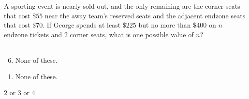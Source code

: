  
A sporting event is nearly sold out, and the only remaining are the corner seats that cost $\$55$ near the away team's reserved seats and the adjacent endzone seats that cost $\$70$.  If George spends at least $\$225$ but no more than $\$400$ on $n$ endzone tickets and $2$ corner seats, what is one possible value of $n$? \\\\


\ifsat
	\begin{enumerate}[label=\Alph*)]
	\end{enumerate}
\else
\fi

\ifacteven
	\begin{enumerate}[label=\textbf{\Alph*.},itemsep=\fill,align=left]
		\setcounter{enumii}{5}
		\item None of these. 
	\end{enumerate}
\else
\fi

\ifactodd
	\begin{enumerate}[label=\textbf{\Alph*.},itemsep=\fill,align=left]
		\item None of these. 
	\end{enumerate}
\else
\fi

\ifgridin
$2$ or $3$ or $4$
\else
\fi

